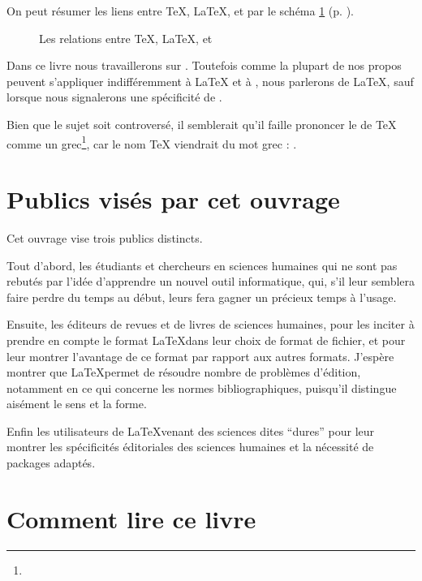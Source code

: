 On peut résumer les liens entre \TeX{}, \LaTeX{}, \XeTeX{} et \XeLaTeX{} par le schéma \ref{sch:tex} (p. \pageref{sch:tex}).

\begin{figure}[ht]
\centering

\caption{Les relations entre \TeX{}, \LaTeX{}, \XeTeX{} et \XeLaTeX{}}\label{sch:tex}
\end{figure} 

Dans  ce livre nous travaillerons sur \XeLaTeX{}. Toutefois comme la plupart de nos propos peuvent s'appliquer indifféremment  à \LaTeX{} et à \XeLaTeX{}, nous parlerons de \LaTeX{}, sauf lorsque nous signalerons une spécificité de \XeLaTeX{}.

\begin{anedocte}
Bien que le sujet soit controversé, il semblerait qu'il faille prononcer le   de \TeX{} comme un  grec\footnote{}, car le nom \TeX{} viendrait du mot grec  : .
\end{anedocte}


\section{Publics visés par cet ouvrage}

Cet ouvrage vise  trois publics distincts.

Tout d'abord, les étudiants et chercheurs en sciences humaines qui ne sont pas rebutés par l'idée d'apprendre un nouvel outil informatique, qui, s'il leur semblera faire perdre du temps au début, leurs fera gagner un précieux temps à l'usage.

Ensuite, les éditeurs de revues et de livres de sciences humaines, pour les inciter à prendre en compte le format \LaTeX dans leur choix de format de fichier, et pour leur montrer l'avantage de ce format par rapport aux autres formats. J'espère montrer que \LaTeX permet de résoudre nombre de problèmes d'édition, notamment en ce qui concerne les normes bibliographiques, puisqu'il distingue aisément le sens et la forme.

Enfin les utilisateurs de \LaTeX venant des sciences dites \enquote{dures} pour leur montrer les spécificités éditoriales des sciences humaines et la nécessité de packages adaptés.


\section{Comment lire ce livre}

